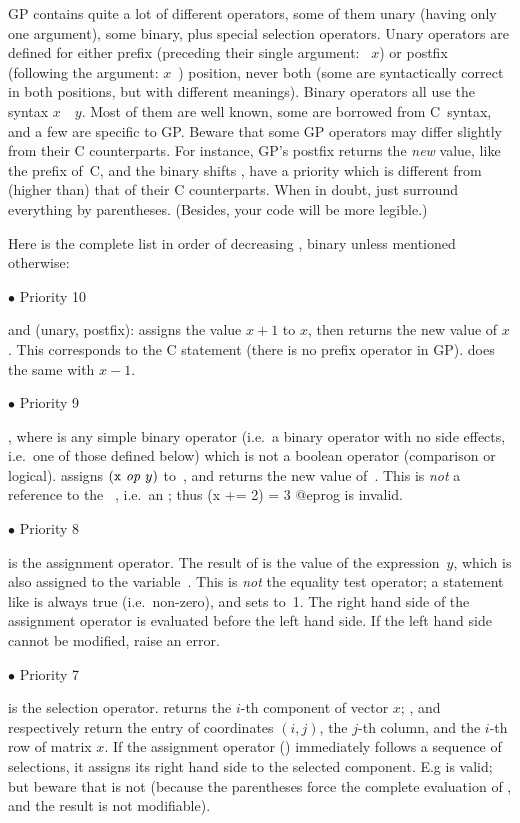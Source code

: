 GP contains quite a lot of different operators, some of them unary (having only
one argument), some binary, plus special selection operators. Unary operators
are defined for either prefix (preceding their single argument: ~$x$)
or postfix (following the argument: $x$~) position, never both (some
are syntactically correct in both positions, but with different meanings).
Binary operators all use the syntax $x$~~$y$. Most of them are well
known, some are borrowed from C~syntax, and a few are specific to GP. Beware
that some GP operators may differ slightly from their C counterparts. For
instance, GP's postfix \kbd{++} returns the \emph{new} value, like the prefix
\kbd{++} of~C, and the binary shifts \kbd{<<}, \kbd{>>} have a priority which
is different from (higher than) that of their C counterparts. When in doubt,
just surround everything by parentheses. (Besides, your code will be
more legible.)

\noindent Here is the complete list in order of decreasing ,
binary unless mentioned otherwise:

\def\point#1{\noindent $\bullet$ #1\hfill\break\indent\strut} \point{Priority
10}
%
\kbd{++} and \kbd{--} (unary, postfix):  assigns the value $x+1$
to $x$, then returns the new value of $x$. This corresponds to the C
statement  (there is no prefix \kbd{++} operator in GP).
 does the same with $x-1$.

\point{Priority 9}
%
, where  is any simple binary operator (i.e.~a binary
operator with no side effects, i.e.~one of those defined below) which is not
a boolean operator (comparison or logical).  assigns
$({\tt x}~\hbox{\it op\/}~y)$ to~, and returns the new value of~.
This is \emph{not} a reference to the ~, i.e.~an
; thus
\bprog
  (x += 2) = 3
@eprog\noindent
is invalid.

\point{Priority 8}
%
\kbd{=} is the assignment operator. The result of  is the value
of the expression~$y$, which is also assigned to the variable~. This
is \emph{not} the equality test operator; a statement like  is
always true (i.e.~non-zero), and sets  to~1. The right hand side of
the assignment operator is evaluated before the left hand side. If the left
hand side cannot be modified, raise an error.

\point{Priority 7} \kbd{[ ]} is the selection operator. 
returns the $i$-th component of vector $x$; ,
 and  respectively return the entry of
coordinates $(i,j)$, the $j$-th column, and the $i$-th row of matrix $x$. If
the assignment operator (\kbd{=}) immediately follows a sequence of
selections, it assigns its right hand side to the selected component. E.g
 is valid; but beware that  is not
(because the parentheses force the complete evaluation of , and the
result is not modifiable).

